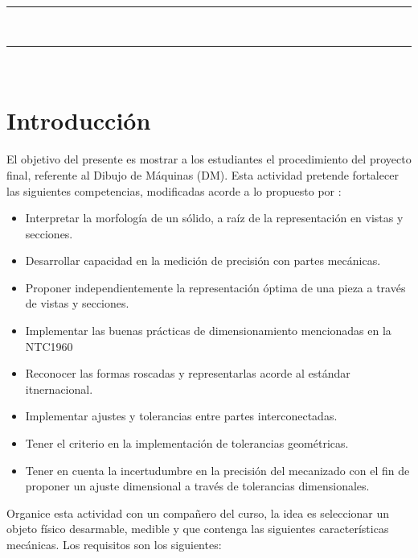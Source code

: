 \documentclass[letterpaper,pdftex]{article}
\begin{document}
\noindent
\textcolor{gray}{\rule{\textwidth}{0.5pt}}\\
\renewcommand{\tablename}{Tabla}
\renewcommand{\arraystretch}{1.2}
\renewcommand\contentsname{Contenido}
\tableofcontents

\noindent
\textcolor{gray}{\rule{\textwidth}{0.5pt}}\\

\section{Introducci\'on}

El objetivo del presente es mostrar a los estudiantes el procedimiento del proyecto final, referente al Dibujo de Máquinas (DM). Esta actividad pretende fortalecer las siguientes competencias, modificadas acorde a lo propuesto por \cite{Metraglia2014}:

\begin{itemize}
\item Interpretar la morfología de un sólido, a raíz de la representación en vistas y secciones.
\item Desarrollar capacidad en la medición de precisión con partes mecánicas.
\item Proponer independientemente la representación óptima de una pieza a través de vistas y secciones. 
\item Implementar las buenas prácticas de dimensionamiento mencionadas en la NTC1960 \cite{ICONTEC2009}
\item Reconocer las formas roscadas y representarlas acorde al estándar itnernacional.
\item Implementar ajustes y tolerancias entre partes interconectadas.
\item Tener el criterio en la implementación de tolerancias geométricas.
\item Tener en cuenta la incertudumbre en la precisión del mecanizado con el fin de proponer un ajuste dimensional a través de tolerancias dimensionales.
\end{itemize} 

Organice esta actividad con un compañero del curso, la idea es seleccionar un objeto físico desarmable, medible y que contenga las siguientes características mecánicas. Los requisitos son los siguientes:
\end{document}

